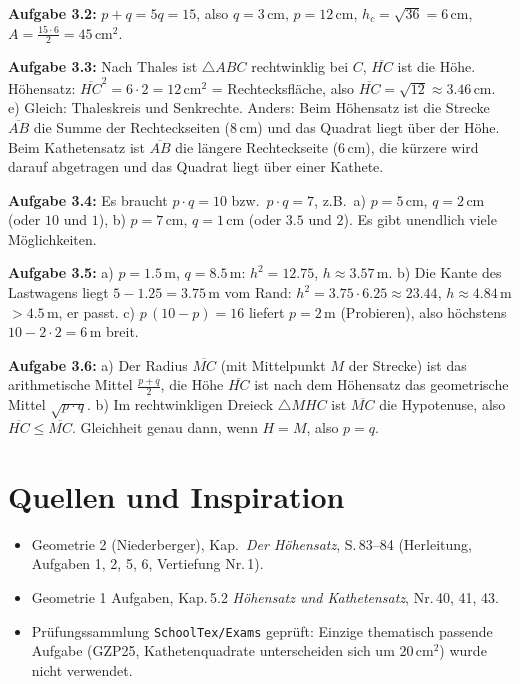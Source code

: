 \documentclass[11pt,oneside]{article}
\begin{document}
\textbf{Aufgabe 3.2:} $p+q=5q=15$, also $q=3$\,cm, $p=12$\,cm, $h_c=\sqrt{36}=6$\,cm, $A=\frac{15\cdot 6}{2}=45$\,cm$^2$.

\textbf{Aufgabe 3.3:} Nach Thales ist $\triangle ABC$ rechtwinklig bei $C$, $\overline{HC}$ ist die Höhe. Höhensatz: $\overline{HC}^2=6\cdot 2=12$\,cm$^2$ = Rechtecksfläche, also $\overline{HC}=\sqrt{12}\approx 3.46$\,cm.\\
e) Gleich: Thaleskreis und Senkrechte. Anders: Beim Höhensatz ist die Strecke $\overline{AB}$ die Summe der Rechteckseiten ($8$\,cm) und das Quadrat liegt über der Höhe. Beim Kathetensatz ist $\overline{AB}$ die längere Rechteckseite ($6$\,cm), die kürzere wird darauf abgetragen und das Quadrat liegt über einer Kathete.

\textbf{Aufgabe 3.4:} Es braucht $p\cdot q=10$ bzw.\ $p\cdot q=7$, z.B.\ a) $p=5$\,cm, $q=2$\,cm (oder $10$ und $1$), b) $p=7$\,cm, $q=1$\,cm (oder $3.5$ und $2$). Es gibt unendlich viele Möglichkeiten.

\textbf{Aufgabe 3.5:}
a) $p=1.5$\,m, $q=8.5$\,m: $h^2=12.75$, $h\approx 3.57$\,m.
b) Die Kante des Lastwagens liegt $5-1.25=3.75$\,m vom Rand: $h^2=3.75\cdot 6.25\approx 23.44$, $h\approx 4.84$\,m $>4.5$\,m, er passt.
c) $p\,(10-p)=16$ liefert $p=2$\,m (Probieren), also höchstens $10-2\cdot 2=6$\,m breit.

\textbf{Aufgabe 3.6:} a) Der Radius $\overline{MC}$ (mit Mittelpunkt $M$ der Strecke) ist das arithmetische Mittel $\frac{p+q}{2}$, die Höhe $\overline{HC}$ ist nach dem Höhensatz das geometrische Mittel $\sqrt{p\cdot q}$. b) Im rechtwinkligen Dreieck $\triangle MHC$ ist $\overline{MC}$ die Hypotenuse, also $\overline{HC}\leq\overline{MC}$. Gleichheit genau dann, wenn $H=M$, also $p=q$.

\section*{Quellen und Inspiration}
\begin{itemize}[itemsep=0pt]
	\item Geometrie 2 (Niederberger), Kap.\ \textit{Der Höhensatz}, S.\,83--84 (Herleitung, Aufgaben 1, 2, 5, 6, Vertiefung Nr.\,1).
	\item Geometrie 1 Aufgaben, Kap.\,5.2 \textit{Höhensatz und Kathetensatz}, Nr.\,40, 41, 43.
	\item Prüfungssammlung \texttt{SchoolTex/Exams} geprüft: Einzige thematisch passende Aufgabe (GZP25, Kathetenquadrate unterscheiden sich um $20$\,cm$^2$) wurde nicht verwendet.
\end{itemize}
\end{document}
